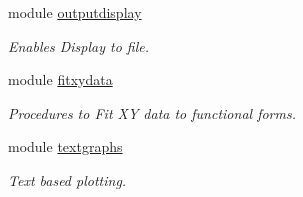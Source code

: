 \begin{DoxyCompactItemize}
module \hyperlink{namespaceoutputdisplay}{outputdisplay}
\begin{DoxyCompactList}\small\item\em Enables Display to file. \end{DoxyCompactList}\item 
module \hyperlink{namespacefitxydata}{fitxydata}
\begin{DoxyCompactList}\small\item\em Procedures to Fit XY data to functional forms. \end{DoxyCompactList}\item 
module \hyperlink{namespacetextgraphs}{textgraphs}
\begin{DoxyCompactList}\small\item\em Text based plotting. \end{DoxyCompactList}\end{DoxyCompactItemize}
